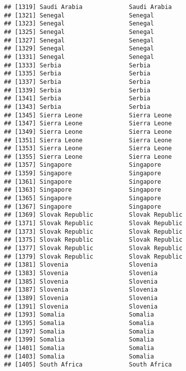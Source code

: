 \documentclass[]{article}
\begin{document}
\begin{verbatim}
## [1319] Saudi Arabia             Saudi Arabia            
## [1321] Senegal                  Senegal                 
## [1323] Senegal                  Senegal                 
## [1325] Senegal                  Senegal                 
## [1327] Senegal                  Senegal                 
## [1329] Senegal                  Senegal                 
## [1331] Senegal                  Senegal                 
## [1333] Serbia                   Serbia                  
## [1335] Serbia                   Serbia                  
## [1337] Serbia                   Serbia                  
## [1339] Serbia                   Serbia                  
## [1341] Serbia                   Serbia                  
## [1343] Serbia                   Serbia                  
## [1345] Sierra Leone             Sierra Leone            
## [1347] Sierra Leone             Sierra Leone            
## [1349] Sierra Leone             Sierra Leone            
## [1351] Sierra Leone             Sierra Leone            
## [1353] Sierra Leone             Sierra Leone            
## [1355] Sierra Leone             Sierra Leone            
## [1357] Singapore                Singapore               
## [1359] Singapore                Singapore               
## [1361] Singapore                Singapore               
## [1363] Singapore                Singapore               
## [1365] Singapore                Singapore               
## [1367] Singapore                Singapore               
## [1369] Slovak Republic          Slovak Republic         
## [1371] Slovak Republic          Slovak Republic         
## [1373] Slovak Republic          Slovak Republic         
## [1375] Slovak Republic          Slovak Republic         
## [1377] Slovak Republic          Slovak Republic         
## [1379] Slovak Republic          Slovak Republic         
## [1381] Slovenia                 Slovenia                
## [1383] Slovenia                 Slovenia                
## [1385] Slovenia                 Slovenia                
## [1387] Slovenia                 Slovenia                
## [1389] Slovenia                 Slovenia                
## [1391] Slovenia                 Slovenia                
## [1393] Somalia                  Somalia                 
## [1395] Somalia                  Somalia                 
## [1397] Somalia                  Somalia                 
## [1399] Somalia                  Somalia                 
## [1401] Somalia                  Somalia                 
## [1403] Somalia                  Somalia                 
## [1405] South Africa             South Africa            

\end{verbatim}
\end{document}
